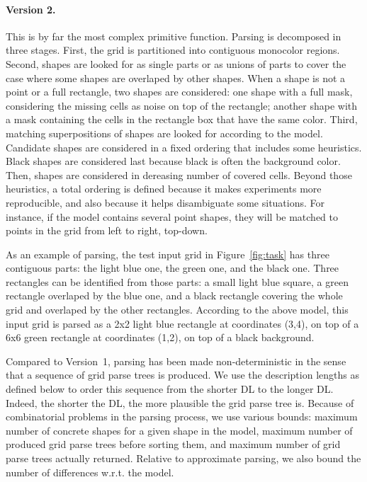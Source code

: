 \documentclass[a4paper]{llncs}
\begin{document}
\paragraph{Version 2.} This is by far the most complex primitive
function.
%
Parsing is decomposed in three stages. First, the grid is partitioned
into contiguous monocolor regions.
%
Second, shapes are looked for as single parts or as unions of parts to
cover the case where some shapes are overlaped by other shapes. When a
shape is not a point or a full rectangle, two shapes are considered:
one shape with a full mask, considering the missing cells as noise on
top of the rectangle; another shape with a mask containing the cells
in the rectangle box that have the same color. 
%
Third, matching superpositions of shapes are looked for according to
the model. Candidate shapes are considered in a fixed ordering that
includes some heuristics. Black shapes are considered last because
black is often the background color. Then, shapes are considered in
dereasing number of covered cells. Beyond those heuristics, a total
ordering is defined because it makes experiments more reproducible,
and also because it helps disambiguate some situations. For instance,
if the model contains several point shapes, they will be matched to
points in the grid from left to right, top-down.

As an example of parsing, the test input grid in Figure~\ref{fig:task}
has three contiguous parts: the light blue one, the green one, and the
black one. Three rectangles can be identified from those parts: a
small light blue square, a green rectangle overlaped by the blue one,
and a black rectangle covering the whole grid and overlaped by the
other rectangles. According to the above model, this input grid is
parsed as a 2x2 light blue rectangle at coordinates (3,4), on top of a
6x6 green rectangle at coordinates (1,2), on top of a black
background.

Compared to Version~1, parsing has been made non-deterministic in the
sense that a sequence of grid parse trees is produced. We use the
description lengths as defined below to order this sequence from the
shorter DL to the longer DL. Indeed, the shorter the DL, the more
plausible the grid parse tree is. Because of combinatorial problems in
the parsing process, we use various bounds: maximum number of concrete
shapes for a given shape in the model, maximum number of produced grid
parse trees before sorting them, and maximum number of grid parse
trees actually returned. Relative to approximate parsing, we also
bound the number of differences w.r.t. the model.
\end{document}
